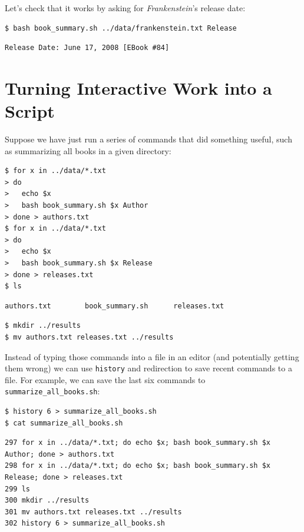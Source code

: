 \documentclass[
]{krantz}
\begin{document}
Let's check that it works by asking for \emph{Frankenstein}'s release date:

\begin{verbatim}
$ bash book_summary.sh ../data/frankenstein.txt Release
\end{verbatim}

\begin{verbatim}
Release Date: June 17, 2008 [EBook #84]
\end{verbatim}

\hypertarget{bash-advanced-capture}{%
\section{Turning Interactive Work into a Script}\label{bash-advanced-capture}}

Suppose we have just run a series of commands that did something useful,
such as summarizing all books in a given directory:

\begin{verbatim}
$ for x in ../data/*.txt
> do 
>   echo $x
>   bash book_summary.sh $x Author 
> done > authors.txt
$ for x in ../data/*.txt
> do 
>   echo $x
>   bash book_summary.sh $x Release 
> done > releases.txt
$ ls
\end{verbatim}

\begin{verbatim}
authors.txt        book_summary.sh      releases.txt
\end{verbatim}

\begin{verbatim}
$ mkdir ../results
$ mv authors.txt releases.txt ../results
\end{verbatim}

Instead of typing those commands into a file in an editor
(and potentially getting them wrong)
we can use \texttt{history} and redirection to save recent commands to a file.
For example,
we can save the last six commands to \texttt{summarize\_all\_books.sh}:

\begin{verbatim}
$ history 6 > summarize_all_books.sh
$ cat summarize_all_books.sh
\end{verbatim}

\begin{verbatim}
297 for x in ../data/*.txt; do echo $x; bash book_summary.sh $x Author; done > authors.txt
298 for x in ../data/*.txt; do echo $x; bash book_summary.sh $x Release; done > releases.txt
299 ls
300 mkdir ../results
301 mv authors.txt releases.txt ../results
302 history 6 > summarize_all_books.sh
\end{verbatim}
\end{document}
